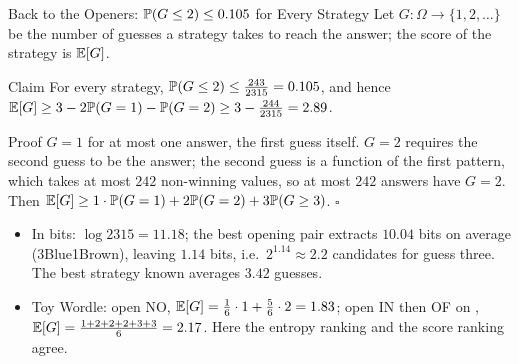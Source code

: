 \begin{frame}{Back to the Openers: $\mathbb{P}(G\le2)\le0.105$ for Every Strategy}
  \small
  Let $G\colon\Omega\to\{1,2,\dots\}$ be the number of guesses a strategy takes to reach the answer; the score of the strategy is $\mathbb{E}[G]$.
  \begin{block}{Claim}
    For every strategy, $\mathbb{P}(G\le2)\le\tfrac{243}{2315}=0.105$, and hence $\mathbb{E}[G]\ge3-2\mathbb{P}(G=1)-\mathbb{P}(G=2)\ge3-\tfrac{244}{2315}=2.89$.
  \end{block}
  \begin{block}{Proof}
    $G=1$ for at most one answer, the first guess itself. $G=2$ requires the second guess to be the answer; the second guess is a function of the first pattern, which takes at most $242$ non-winning values, so at most $242$ answers have $G=2$. Then $\mathbb{E}[G]\ge1\cdot\mathbb{P}(G=1)+2\mathbb{P}(G=2)+3\mathbb{P}(G\ge3)$. \hfill$\square$
  \end{block}
  \begin{itemize}
    \item In bits: $\log2315=11.18$; the best opening pair extracts $10.04$ bits on average (3Blue1Brown), leaving $1.14$ bits, i.e.\ $2^{1.14}\approx2.2$ candidates for guess three. The best strategy known averages $3.42$ guesses.
    \item Toy Wordle: open \textsf{NO}, $\mathbb{E}[G]=\tfrac16\cdot1+\tfrac56\cdot2=1.83$; open \textsf{IN} then \textsf{OF} on \cB\cB, $\mathbb{E}[G]=\tfrac{1+2+2+2+3+3}6=2.17$. Here the entropy ranking and the score ranking agree.
  \end{itemize}
\end{frame}

